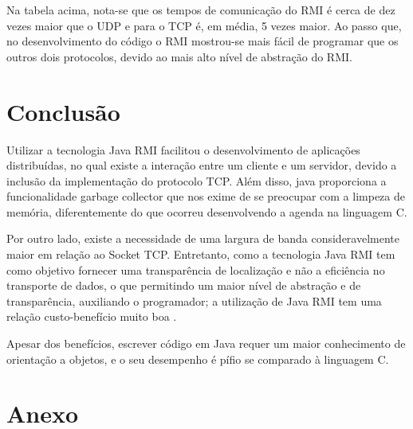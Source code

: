 \documentclass[10pt,a4paper]{article}
\begin{document}
Na tabela acima, nota-se que os tempos de comunicação do RMI é cerca de dez vezes maior que o UDP e para o TCP é, em média, 5 vezes maior. Ao passo que, no desenvolvimento do código o RMI mostrou-se mais fácil de programar que os outros dois protocolos, devido ao mais alto nível de abstração do RMI.

\section{Conclusão}

Utilizar a tecnologia Java RMI facilitou o desenvolvimento de aplicações distribuídas,
no qual existe a interação entre um cliente e um servidor, devido a inclusão da implementação 
do protocolo TCP. Além disso, java proporciona a funcionalidade garbage collector que nos exime de
se preocupar com a limpeza de memória, diferentemente do que ocorreu desenvolvendo a agenda na linguagem C.

Por outro lado, existe a necessidade de uma largura de banda consideravelmente
maior em relação ao Socket TCP. Entretanto, como a tecnologia Java RMI
tem como objetivo fornecer uma transparência de localização e não a eficiência no
transporte de dados, o que permitindo um maior nível de abstração e de transparência,
auxiliando o programador; a utilização de Java RMI tem uma relação custo-benefício muito boa .

Apesar dos benefícios, escrever código em Java requer um maior conhecimento de orientação a objetos,
e o seu desempenho é pífio se comparado à linguagem C.



\begin{small}
  
\end{small}
\newpage
\section{Anexo}



 \begin{multicols}{1}





 \end{multicols}
\end{document}
